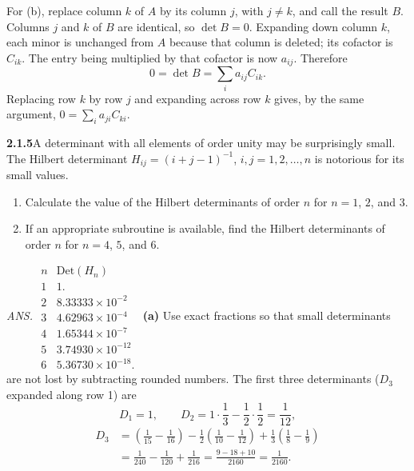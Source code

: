 For (b), replace column $k$ of $A$ by its column $j$, with $j\ne k$,
and call the result $B$. Columns $j$ and $k$ of $B$ are identical, so
$\det B=0$. Expanding down column $k$, each minor is unchanged
from $A$ because that column is deleted; its cofactor is $C_{ik}$.
The entry being multiplied by that cofactor is now $a_{ij}$. Therefore
\[
0=\det B=\sum_i a_{ij}C_{ik}.
\]
Replacing row $k$ by row $j$ and expanding across row $k$ gives,
by the same argument, $0=\sum_i a_{ji}C_{ki}$.

\par\bigskip
\noindent\textbf{2.1.5}\quad A determinant with all elements of order unity
may be surprisingly small. The Hilbert determinant
$H_{ij}=(i+j-1)^{-1}$, $i,j=1,2,\ldots,n$ is notorious for its small values.
\begin{enumerate}
\item[(a)] Calculate the value of the Hilbert determinants of order $n$ for
  $n=1$, $2$, and $3$.
\item[(b)] If an appropriate subroutine is available, find the Hilbert
  determinants of order $n$ for $n=4$, $5$, and $6$.
\end{enumerate}
\par\nobreak\hfill\emph{ANS.}\enspace
$\begin{array}{cr}
n&\mathrm{Det}(H_{n})\\
1&1.\\
2&8.33333\times10^{-2}\\
3&4.62963\times10^{-4}\\
4&1.65344\times10^{-7}\\
5&3.74930\times10^{-12}\\
6&5.36730\times10^{-18}.
\end{array}$
\solution
\textbf{(a)} Use exact fractions so that small determinants are not lost
by subtracting rounded numbers. The first three determinants ($D_3$
expanded along row 1) are
\[
D_1=1,\qquad D_2=1\cdot\frac13-\frac12\cdot\frac12=\frac1{12},
\]
\[
\begin{aligned}
D_3
&=\left(\frac1{15}-\frac1{16}\right)
-\frac12\left(\frac1{10}-\frac1{12}\right)
+\frac13\left(\frac18-\frac19\right)\\
&=\frac1{240}-\frac1{120}+\frac1{216}
=\frac{9-18+10}{2160}=\frac1{2160}.
\end{aligned}
\]

